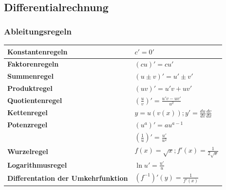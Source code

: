 \subsection{Differentialrechnung}
\subsubsection{Ableitungsregeln}
\renewcommand{\arraystretch}{1.5}
\begin{tabular}{|l|l|}
	\hline \textbf{Konstantenregeln}& $c'=0'$\\
	\hline \textbf{Faktorenregeln}& $(cu)'=c u'$\\
	\hline \textbf{Summenregel}& $(u\pm v)'= u' \pm v'$\\
	\hline \textbf{Produktregel}& $(uv)'=u'v + uv'$\\
	\hline \textbf{Quotientenregel}& $(\frac{u}{v})'= \frac{u'v-uv'}{u^{2}}$\\
	\hline \textbf{Kettenregel}& $y=u(v(x)) ; y'=\frac{du}{dv} \frac{dv}{dx}$\\
	\hline \textbf{Potenzregel} & $(u^{a})'=au^{a-1}$\\
	& $(\frac{1}{u})'= \frac{u'}{u^2}$\\
	\hline	\textbf{Wurzelregel} & $f(x)=\sqrt{x} ; f'(x)=\frac{1}{2\sqrt{x}}$\\
	\hline	\textbf{Logarithmusregel} & $\ln{u}'=\frac{u'}{u}$\\ 
	\hline	\textbf{Differentation der Umkehrfunktion} & $(f^{-1})'(y)=\frac{1}{f'(x)} $\\
	\hline 
\end{tabular}
